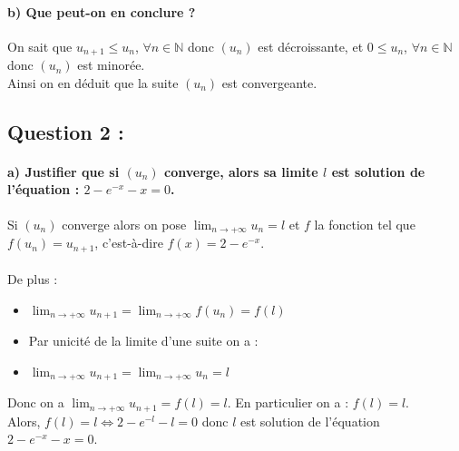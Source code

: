\documentclass[a4paper, 12pt]{article}
\begin{document}
{}
\paragraph*{b) Que peut-on en conclure ?\\[5mm]}

On sait que $u_{n+1} \leq u_n$, $\forall n \in \mathbb{N}$ donc $(u_n)$ est décroissante, et $0 \leq u_n$, $\forall n \in \mathbb{N}$ donc $(u_n)$ est minorée. 
\\
Ainsi on en déduit que la suite $(u_n)$ est convergeante.

{}
\subsection*{Question 2 :}

{}
\paragraph*{a) Justifier que si $(u_n)$ converge, alors sa limite $l$ est solution de l'équation : $2 - e^{-x}-x=0$.\\[5mm]}

Si $(u_n)$ converge alors on pose $\displaystyle \lim_{n \to +\infty}u_n=l$ et $f$ la fonction tel que $f(u_n) = u_{n+1}$, c'est-à-dire $f(x) = 2 - e^{-x}$.
\\ \\
De plus :
\begin{itemize} 
    \item[\textbullet] $\displaystyle \lim_{n \to +\infty} u_{n+1} = \displaystyle \lim_{n \to +\infty} f(u_n) = f(l)$ \\[0.5mm]
    \item[] Par unicité de la limite d'une suite on a : \\[0.5mm]
    \item[\textbullet] $\displaystyle \lim_{n \to +\infty} u_{n+1} = \displaystyle \lim_{n \to +\infty} u_n = l$ \\[1mm]
\end{itemize}
Donc on a $\displaystyle \lim_{n \to +\infty} u_{n+1} = f(l) = l$. En particulier on a : $f(l) = l$.
\\
Alors, $f(l) = l \iff 2 - e^{-l} - l = 0$ donc $l$ est solution de l'équation $2 - e^{-x}-x=0$.

{}
\end{document}
